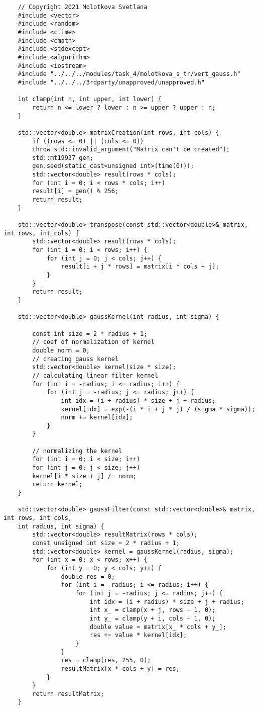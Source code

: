 \documentclass{report}
\begin{document}
\begin{lstlisting}
	// Copyright 2021 Molotkova Svetlana
	#include <vector>
	#include <random>
	#include <ctime>
	#include <cmath>
	#include <stdexcept>
	#include <algorithm>
	#include <iostream>
	#include "../../../modules/task_4/molotkova_s_tr/vert_gauss.h"
	#include "../../../3rdparty/unapproved/unapproved.h"
	
	int clamp(int n, int upper, int lower) {
		return n <= lower ? lower : n >= upper ? upper : n;
	}
	
	std::vector<double> matrixCreation(int rows, int cols) {
		if ((rows <= 0) || (cols <= 0))
		throw std::invalid_argument("Matrix can't be created");
		std::mt19937 gen;
		gen.seed(static_cast<unsigned int>(time(0)));
		std::vector<double> result(rows * cols);
		for (int i = 0; i < rows * cols; i++)
		result[i] = gen() % 256;
		return result;
	}
	
	std::vector<double> transpose(const std::vector<double>& matrix, int rows, int cols) {
		std::vector<double> result(rows * cols);
		for (int i = 0; i < rows; i++) {
			for (int j = 0; j < cols; j++) {
				result[i + j * rows] = matrix[i * cols + j];
			}
		}
		return result;
	}
	
	std::vector<double> gaussKernel(int radius, int sigma) {
	
		const int size = 2 * radius + 1;
		// coef of normalization of kernel
		double norm = 0;
		// creating gauss kernel
		std::vector<double> kernel(size * size);
		// calculating linear filter kernel
		for (int i = -radius; i <= radius; i++) {
			for (int j = -radius; j <= radius; j++) {
				int idx = (i + radius) * size + j + radius;
				kernel[idx] = exp(-(i * i + j * j) / (sigma * sigma));
				norm += kernel[idx];
			}
		}
		
		// normalizing the kernel
		for (int i = 0; i < size; i++)
		for (int j = 0; j < size; j++)
		kernel[i * size + j] /= norm;
		return kernel;
	}
	
	std::vector<double> gaussFilter(const std::vector<double>& matrix, int rows, int cols,
	int radius, int sigma) {
		std::vector<double> resultMatrix(rows * cols);
		const unsigned int size = 2 * radius + 1;
		std::vector<double> kernel = gaussKernel(radius, sigma);
		for (int x = 0; x < rows; x++) {
			for (int y = 0; y < cols; y++) {
				double res = 0;
				for (int i = -radius; i <= radius; i++) {
					for (int j = -radius; j <= radius; j++) {
						int idx = (i + radius) * size + j + radius;
						int x_ = clamp(x + j, rows - 1, 0);
						int y_ = clamp(y + i, cols - 1, 0);
						double value = matrix[x_ * cols + y_];
						res += value * kernel[idx];
					}
				}
				res = clamp(res, 255, 0);
				resultMatrix[x * cols + y] = res;
			}
		}
		return resultMatrix;
	}
	

\end{lstlisting}
\end{document}
